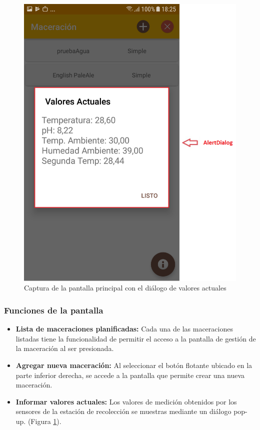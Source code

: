                  \begin{figure}[h]
                    \centering
                    \includegraphics[scale=0.2]{software/ScreenCapture/ShowCurrentValues.jpg}
                    \caption{Captura de la pantalla principal con el diálogo de valores actuales}
                    \label{fig:CapturaShowCurrentValues}
                \end{figure}
                
                
            \subsubsection{Funciones de la pantalla}
                \begin{itemize}
                    \item \textbf{Lista de maceraciones planificadas:} Cada una de las maceraciones listadas tiene la funcionalidad de permitir el acceso a la pantalla de gestión de la maceración al ser presionada.
                    
                    \item \textbf{Agregar nueva maceración:} Al seleccionar el botón flotante ubicado en la parte inferior derecha, se accede a la pantalla que permite crear una nueva maceración.
                    
                    \item \textbf{Informar valores actuales:} Los valores de medición obtenidos por los sensores de la estación de recolección se muestras mediante un diálogo pop-up. (Figura \ref{fig:CapturaShowCurrentValues}).
            \end{itemize}

